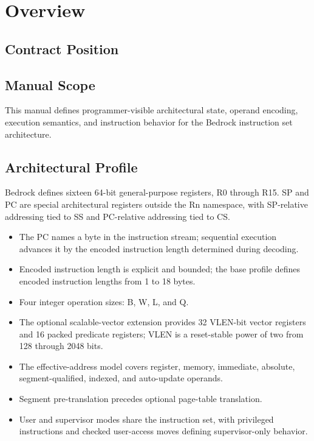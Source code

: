 \clearpage
\section{Overview}\label{page:overview}

\subsection{Contract Position}

\subsection{Manual Scope}
This manual defines programmer-visible architectural state, operand encoding, execution semantics,
and instruction behavior for the Bedrock instruction set architecture.

\Needspace{3.5in}
\subsection{Architectural Profile}
Bedrock defines sixteen 64-bit general-purpose registers, R0 through R15. SP and PC are special architectural registers outside the
Rn namespace, with SP-relative addressing tied to SS and PC-relative addressing tied to CS.

\begin{itemize}
\item The PC names a byte in the instruction stream; sequential execution advances it by the encoded instruction length determined during decoding.
\item Encoded instruction length is explicit and bounded; the base profile defines encoded instruction lengths from 1 to 18 bytes.
\item Four integer operation sizes: B, W, L, and Q.
\item The optional scalable-vector extension provides 32 VLEN-bit vector registers and 16 packed predicate registers; VLEN is a reset-stable power of two from 128 through 2048 bits.
\item The effective-address model covers register, memory, immediate, absolute, segment-qualified, indexed, and auto-update operands.
\item Segment pre-translation precedes optional page-table translation.
\item User and supervisor modes share the instruction set, with privileged instructions and checked user-access moves defining supervisor-only behavior.
\end{itemize}
